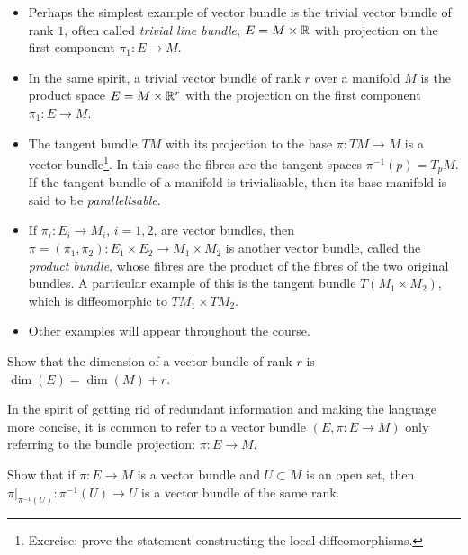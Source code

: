 \begin{example}\label{ex:simple_bundles}
	\begin{itemize}
		\item Perhaps the simplest example of vector bundle is the trivial vector bundle of rank $1$, often called \emph{trivial line bundle}, $E = M \times \mathbb{R}$ with projection on the first component $\pi_1: E \to M$.
		\item In the same spirit, a trivial vector bundle of rank $r$ over a manifold $M$ is the product space $E = M\times \mathbb{R}^r$ with the projection on the first component $\pi_1: E\to M$.
		\item The tangent bundle $TM$ with its projection to the base $\pi:TM\to M$ is a vector bundle\footnote{Exercise: prove the statement constructing the local diffeomorphisms.}.
		      In this case the fibres are the tangent spaces $\pi^{-1}(p) = T_pM$.
		      If the tangent bundle of a manifold is trivialisable, then its base manifold is said to be \emph{parallelisable}.
		\item If $\pi_i: E_i\to M_i$, $i=1,2$, are vector bundles, then $\pi = (\pi_1, \pi_2): E_1\times E_2 \to M_1\times M_2$ is another vector bundle, called the \emph{product bundle}, whose fibres are the product of the fibres of the two original bundles.
		      A particular example of this is the tangent bundle $T(M_1\times M_2)$, which is diffeomorphic to $TM_1 \times TM_2$.
		\item Other examples will appear throughout the course.
	\end{itemize}
\end{example}

\begin{exercise}
	Show that the dimension of a vector bundle of rank $r$ is $\dim(E) = \dim(M) + r$.
\end{exercise}

\begin{remark}
	In the spirit of getting rid of redundant information and making the language more concise, it is common to refer to a vector bundle $(E, \pi : E \to M)$ only referring to the bundle projection: $\pi : E \to M$.
\end{remark}

\begin{exercise}
	Show that if $\pi:E\to M$ is a vector bundle and $U\subset M$ is an open set, then $\pi\big|_{\pi^{-1}(U)}: \pi^{-1}(U) \to U$ is a vector bundle of the same rank.
\end{exercise}

